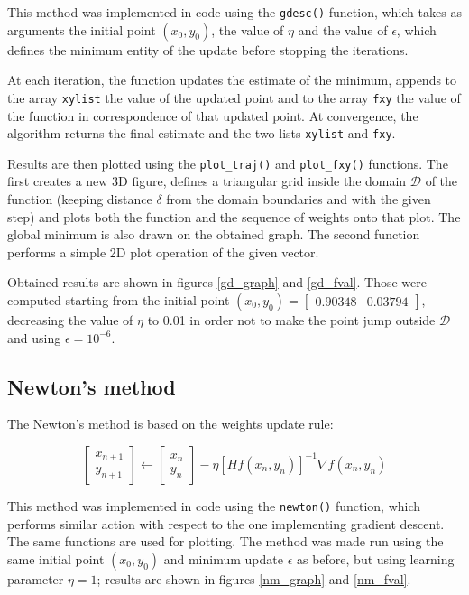 \documentclass[letterpaper,headings=standardclasses]{scrartcl}
\begin{document}
This method was implemented in code using the \texttt{gdesc()} function, which takes as arguments the initial point $(x_0, y_0)$, the value of $\eta$ and the value of $\epsilon$, which defines the minimum entity of the update before stopping the iterations.

At each iteration, the function updates the estimate of the minimum, appends to the array \texttt{xylist} the value of the updated point and to the array \texttt{fxy} the value of the function in correspondence of that updated point. At convergence, the algorithm returns the final estimate and the two lists \texttt{xylist} and \texttt{fxy}.

Results are then plotted using the \texttt{plot\_traj()} and \texttt{plot\_fxy()} functions. The first creates a new 3D figure, defines a triangular grid inside the domain $\mathcal{D}$ of the function (keeping distance $\delta$ from the domain boundaries and with the given step) and plots both the function and the sequence of weights onto that plot. The global minimum is also drawn on the obtained graph. The second function performs a simple 2D plot operation of the given vector.

Obtained results are shown in figures \ref{gd_graph} and \ref{gd_fval}. Those were computed starting from the initial point $ (x_0, y_0) = [\begin{matrix} 0.90348 & 0.03794 \end{matrix}] $, decreasing the value of $\eta$ to 0.01 in order not to make the point jump outside $\mathcal{D}$ and using $\epsilon = 10^{-6}$.

\subsection{Newton's method}

The Newton's method is based on the weights update rule:

$$ \left[ \begin{matrix} x_{n+1} \\ y_{n+1} \end{matrix} \right] \leftarrow \left[ \begin{matrix} x_n \\ y_n \end{matrix} \right] - \eta [Hf(x_n, y_n)]^{-1} \nabla f(x_n,y_n) $$

This method was implemented in code using the \texttt{newton()} function, which performs similar action with respect to the one implementing gradient descent. The same functions are used for plotting. The method was made run using the same initial point $(x_0, y_0)$ and minimum update $\epsilon$ as before, but using learning parameter $\eta = 1$; results are shown in figures \ref{nm_graph} and \ref{nm_fval}.
\end{document}
